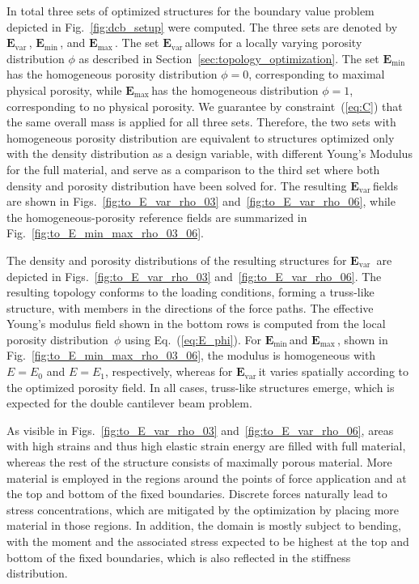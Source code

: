 \documentclass[
	pdflatex,
	sn-mathphys-num
]{sn-jnl}
\newcommand{\Evar}{\ensuremath{\mathbf{E}_{\text{var}}}{\,}}
\newcommand{\Emin}{\ensuremath{\mathbf{E}_{\text{min}}}{\,}}
\newcommand{\Emax}{\ensuremath{\mathbf{E}_{\text{max}}}{\,}}
\theoremstyle{thmstyleone}%
\theoremstyle{thmstyletwo}%
\theoremstyle{thmstylethree}%
\begin{document}
In total three sets of optimized structures for the boundary
value problem depicted in Fig.~\ref{fig:dcb_setup}
were computed.
The three sets are denoted by \Evar, \Emin, and \Emax. The set
\Evar allows for a locally varying porosity distribution
$\phi$ as described in Section~\ref{sec:topology_optimization}.
The set \Emin has the homogeneous porosity distribution
$\phi=0$, corresponding to maximal physical porosity, while
\Emax has the homogeneous distribution $\phi=1$, corresponding
to no physical porosity.
We guarantee by constraint~(\ref{eq:C}) that the
same overall mass is applied for all three sets. 
Therefore, the two sets with homogeneous porosity distribution are equivalent to structures optimized only with the density distribution as a design variable, with different Young's Modulus for the full material, and serve as a comparison to the third set where both density and porosity distribution have been solved for.
The resulting \Evar fields are shown in
Figs.~\ref{fig:to_E_var_rho_03}
and~\ref{fig:to_E_var_rho_06}, while the homogeneous-porosity
reference fields are summarized in
Fig.~\ref{fig:to_E_min_max_rho_03_06}.

The density and porosity distributions of the resulting
structures for \Evar
are depicted in Figs.~\ref{fig:to_E_var_rho_03}
and~\ref{fig:to_E_var_rho_06}. The resulting topology conforms
to the loading conditions, forming a truss-like structure, with members in the directions of the
force paths. The effective Young's modulus field shown in the
bottom rows is computed from the local porosity distribution~$\phi$ using Eq.~(\ref{eq:E_phi}). For \Emin and \Emax,
shown in Fig.~\ref{fig:to_E_min_max_rho_03_06}, the modulus is
homogeneous with $E=E_0$ and $E=E_1$, respectively, whereas for
\Evar it varies spatially according to the optimized porosity
field. In all cases, truss-like structures emerge, which is
expected for the double cantilever beam problem.

As visible in Figs.~\ref{fig:to_E_var_rho_03}
and~\ref{fig:to_E_var_rho_06}, areas with high strains and
thus high elastic strain energy are filled with full material,
whereas the rest of the structure consists of maximally porous
material. More material is employed in the regions around the
points of force application and at the top and bottom of the
fixed boundaries. Discrete forces naturally lead to stress
concentrations, which are mitigated by the optimization by
placing more material in those regions. In addition, the domain
is mostly subject to bending, with the moment and the
associated stress expected to be highest at the top and bottom
of the fixed boundaries, which is also reflected in the
stiffness distribution.
\end{document}
